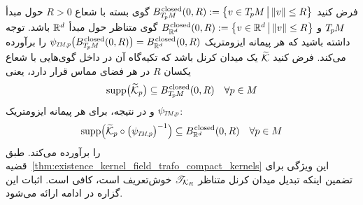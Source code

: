 فرض کنید
$B_{T_{\mkern-1.5mu p}\mkern-.5muM}^{\mkern1.5mu\textup{closed}}(0,R) := \big\{ v\in T_{\mkern-1.5mu p}\mkern-.5muM \,\big|\, \lVert v\rVert \leq R \big\}$
گوی بسته با شعاع $R>0$ حول مبدأ $T_{\mkern-1.5mu p}\mkern-.5muM$ و
$B_{\mathbb{R}^d}^{\mkern1.5mu\textup{closed}}(0,R) := \big\{ v\in\mathbb{R}^d \,\big|\, \lVert v\rVert \leq R \big\}$
گوی متناظر حول مبدأ $\mathbb{R}^d$ باشد.
توجه داشته باشید که هر پیمانه ایزومتریک $\psiTMp\big(B_{\TpM}^{\mkern1.5mu\textup{closed}}(0,R)\big) = B_{\R^d}^{\mkern1.5mu\textup{closed}}(0,R)$ را برآورده می‌کند.
فرض کنید $\widetilde{\mathcal{K}}$ یک میدان کرنل باشد که تکیه‌گاه آن در داخل گوی‌هایی با شعاع یکسان $R$ در هر فضای مماس قرار دارد، یعنی
\begin{align}
    \operatorname{supp}\!\big(\widetilde{\mathcal{K}}_p\big) \subseteq B_{T_{\mkern-1.5mu p}\mkern-.5muM}^{\mkern1.5mu\textup{closed}}(0,R) \quad \forall p\in M
\end{align}
و در نتیجه، برای هر پیمانه ایزومتریک $\psiTMp$:
\begin{align}
    \supp\! \pig(\widetilde{\K}_p \circ \big(\psiTMp\big)^{-1} \pig) \subseteq B_{\R^d}^{\mkern1.5mu\textup{closed}}(0,R) \quad \forall p\in M
\end{align}
را برآورده می‌کند. طبق قضیه~\ref{thm:existence_kernel_field_trafo_compact_kernels} این ویژگی برای تضمین اینکه تبدیل میدان کرنل متناظر $\mathscr{T}_{\mathcal{K}_{\mkern-1muR}}$ خوش‌تعریف است، کافی است.
اثبات این گزاره در ادامه ارائه می‌شود.

